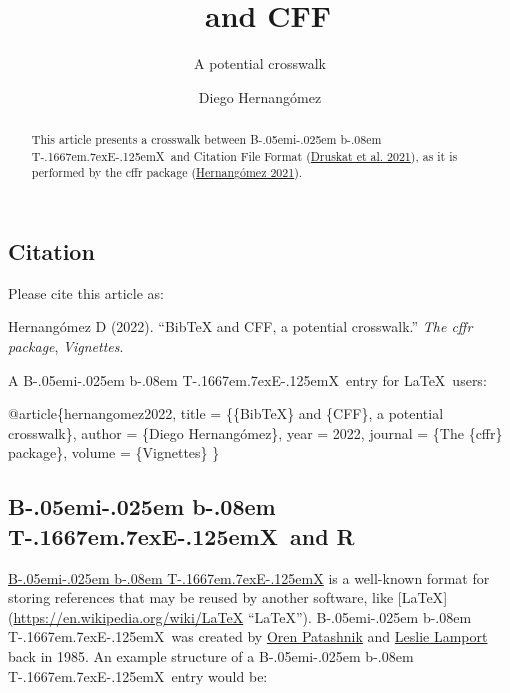 \documentclass[
]{article}
\title{\BibTeX~and CFF}
\subtitle{A potential crosswalk}
\author{Diego Hernangómez}
\date{}
\newenvironment{Shaded}{\begin{snugshade}}{\end{snugshade}}
\newcommand{\DataTypeTok}[1]{\textcolor[rgb]{0.13,0.29,0.53}{#1}}
\newcommand{\NormalTok}[1]{#1}
\newcommand{\OtherTok}[1]{\textcolor[rgb]{0.56,0.35,0.01}{#1}}
\newcommand{\VariableTok}[1]{\textcolor[rgb]{0.00,0.00,0.00}{#1}}
\def\BibTeX{{\rm B\kern-.05em{\sc i\kern-.025em b}\kern-.08em
    T\kern-.1667em\lower.7ex\hbox{E}\kern-.125emX}}
\begin{document}
\maketitle
\begin{abstract}
This article presents a crosswalk between \BibTeX~and Citation File
Format (\protect\hyperlink{ref-druskat_citation_2021}{Druskat et al.
2021}), as it is performed by the cffr package
(\protect\hyperlink{ref-hernangomez2021}{Hernangómez 2021}).
\end{abstract}

\hypertarget{citation}{%
\subsection{Citation}\label{citation}}

Please cite this article as:

Hernangómez D (2022). ``BibTeX and CFF, a potential crosswalk.''
\emph{The cffr package}, \emph{Vignettes}.

A \BibTeX~entry for \LaTeX~users:

\begin{Shaded}
\begin{Highlighting}[]
\VariableTok{@article}\NormalTok{\{}\OtherTok{hernangomez2022}\NormalTok{,}
    \DataTypeTok{title}\NormalTok{        = \{\{BibTeX\} and \{CFF\}, a potential crosswalk\},}
    \DataTypeTok{author}\NormalTok{       = \{Diego Hernangómez\},}
    \DataTypeTok{year}\NormalTok{         = 2022,}
    \DataTypeTok{journal}\NormalTok{      = \{The \{cffr\} package\},}
    \DataTypeTok{volume}\NormalTok{       = \{Vignettes\}}
\NormalTok{\}}
\end{Highlighting}
\end{Shaded}

\hypertarget{and-r}{%
\subsection{\texorpdfstring{\BibTeX~and R}{~and R}}\label{and-r}}

\href{https://en.wikipedia.org/wiki/BibTeX}{\BibTeX} is a well-known
format for storing references that may be reused by another software,
like {[}\LaTeX{]}(\url{https://en.wikipedia.org/wiki/LaTeX} ``LaTeX'').
\BibTeX~was created by
\href{https://en.wikipedia.org/wiki/Oren_Patashnik}{Oren Patashnik} and
\href{https://en.wikipedia.org/wiki/Leslie_Lamport}{Leslie Lamport} back
in 1985. An example structure of a \BibTeX~entry would be:
\end{document}
